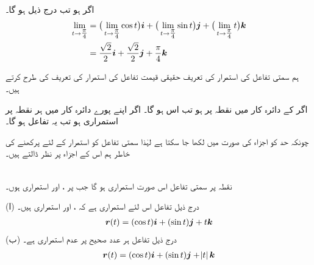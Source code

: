 اگر  ہو تب درج ذیل ہو گا۔
\begin{align*}
\lim_{t\to \tfrac{\pi}{4}}&=\big(\lim_{t\to \tfrac{\pi}{4}}\cos t\big){\boldsymbol{i}}+\big(\lim_{t\to \tfrac{\pi}{4}}\sin t\big){\boldsymbol{j}}+\big(\lim_{t\to \tfrac{\pi}{4}}t\big){\boldsymbol{k}}\\
&=\frac{\sqrt{2}}{2}{\boldsymbol{i}}+\frac{\sqrt{2}}{2}{\boldsymbol{j}}+\frac{\pi}{4}{\boldsymbol{k}}
\end{align*}

ہم سمتی تفاعل کی استمرار کی تعریف  حقیقی قیمت تفاعل کی استمرار کی تعریف کی طرح کرتے ہیں۔

اگر  کے دائرہ کار میں نقطہ  پر     ہو تب    اس ہو گا۔ اگر  اپنے پورے دائرہ کار میں ہر نقطہ پر    استمراری ہو تب یہ تفاعل  ہو گا۔


چونکہ حد کو اجزاء کی صورت میں لکھا جا سکتا ہے لہٰذا  سمتی تفاعل کو استمرار کے لئے پرکھنے کی خاطر ہم اس  کے اجزاء  پر نظر ڈالتے ہیں۔

\\
نقطہ  پر سمتی  تفاعل   اس صورت استمراری ہو گا جب   پر ،  اور  استمراری ہوں۔

(ا) درج ذیل تفاعل اس لئے استمراری  ہے کہ ،  اور  استمراری ہیں۔
\begin{align*}
{\ensuremath{{\boldsymbol{r}}}}(t)=(\cos t){\boldsymbol{i}}+(\sin t){\boldsymbol{j}}+t {\boldsymbol{k}}
\end{align*}
(ب) درج ذیل  تفاعل ہر عدد صحیح پر  عدم استمراری ہے۔
\begin{align*}
{\ensuremath{{\boldsymbol{r}}}}(t)=(\cos t){\boldsymbol{i}}+(\sin t){\boldsymbol{j}}+\abs{t} {\boldsymbol{k}}
\end{align*}

